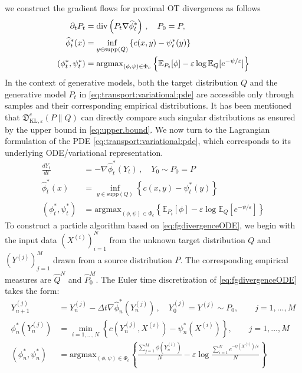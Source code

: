 \documentclass{amsart}
\theoremstyle{definition}
\theoremstyle{remark}
\numberwithin{equation}{section}
\begin{document}
we construct the gradient flows for proximal OT divergences as follows
\begin{align}\label{eq:fgdivergence:gradflow}
\partial_{t}P_t&={\rm div}\left(P_t\nabla \widehat{\phi}_t^{*} \right)\,,\quad P_0=P ,\nonumber\\
 \widehat{\phi}^*_t(x) &= \inf_{y \in \textrm{supp}(Q)} \left\{ c(x,y)- \psi^*_t(y) \right\}\\
(\phi_t^*,\psi_t^*)&=\textrm{argmax}_{(\phi,\psi)\in\Phi_c}\left\{\mathbb{E}_{P_t}[\phi] - \varepsilon \log \mathbb{E}_Q[ e^{-\psi/\varepsilon}]\right\}\nonumber
\end{align}
In the context of generative models, both the target distribution $Q$ and the generative model $P_t$ in \eqref{eq:transport:variational:pde}
are accessible only through samples and their corresponding empirical distributions. It has been mentioned that $\mathfrak{D}_{\mathrm{KL},\varepsilon}^{c}(P\|Q)$ can directly compare such singular distributions as ensured by the upper bound in \eqref{eq:upper.bound}. We now turn to the Lagrangian formulation of the PDE \eqref{eq:transport:variational:pde}, which corresponds to its underlying ODE/variational representation.
\begin{align}\label{eq:fgdivergenceODE}
\frac{d Y_t}{dt}&=-\nabla \widehat{\phi}_t^{*}(Y_t)\, ,\quad Y_0\sim P_0=P\nonumber\\
 \widehat{\phi}^*_t(x) &= \inf_{y \in \textrm{supp}(Q)} \left\{ c(x,y)- \psi^*_t(y) \right\}\\
(\phi_t^*,\psi_t^*)&=\textrm{argmax}_{(\phi,\psi)\in\Phi_c}\left\{\mathbb{E}_{P_t}[\phi] - \varepsilon \log \mathbb{E}_Q[ e^{-\psi/\varepsilon}]\right\}\nonumber
\end{align}
To construct a particle algorithm based on \eqref{eq:fgdivergenceODE}, we begin with the input data $(X^{(i)})_{i=1}^N$ from the unknown target distribution $Q$ and $(Y^{(j)})_{j=1}^M$ drawn from a source distribution  $P$. The corresponding empirical measures are $\hat{Q}^N$ and $\hat{P}_0^M$. The Euler time discretization of \eqref{eq:fgdivergenceODE} takes the form:
\begin{align}\label{eq:fgdivergenceDiscreteScheme}
Y_{n+1}^{(j)}&=Y_{n}^{(j)}-\Delta t\nabla \widehat{\phi}_n^{*}(Y_n^{(j)})\, ,\quad Y_0^{(j)}=Y^{(j)}\sim P_0,\qquad j=1,\dots, M\nonumber\\
\phi^*_n(Y_n^{(j)}) &= \min_{i=1,\dots,N} \left\{ c(Y_n^{(j)},X^{(i)})- \psi^*_n(X^{(i)}) \right\},\qquad j=1,\dots, M\nonumber \\
(\phi_n^*,\psi_n^*)&=\textrm{argmax}_{(\phi,\psi)\in\Phi_c}\left\{\frac{\sum_{j=1}^M\phi(Y_n^{(i)})}{N} - \varepsilon \log \frac{\sum_{i=1}^N e^{-\psi(X^{(i)})/\varepsilon}}{N}\right\}
\end{align}
\end{document}
